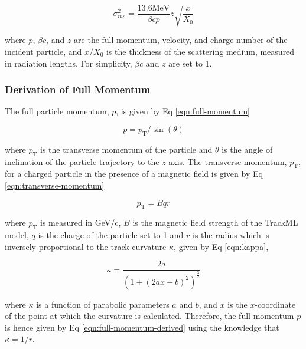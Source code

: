 
\begin{equation}
    \sigma_{ms}^{2} = \frac{13.6 \text{MeV}}{\beta c p} z \sqrt{\frac{x}{X_0}}
    \label{eqn:simplified-moliere-equation}
\end{equation}

where $p$, $\beta c$, and $z$ are the full momentum, velocity, and charge number of the incident particle, and $x/X_0$ is the thickness of the scattering medium, measured in radiation lengths. For simplicity, $\beta c$ and $z$ are set to 1. 




\subsubsection{Derivation of Full Momentum}

The full particle momentum, $p$, is given by Eq \eqref{eqn:full-momentum}

\begin{equation}
    p = p_\text{T} / \sin(\theta)
    \label{eqn:full-momentum}
\end{equation}

where $p_\text{T}$ is the transverse momentum of the particle and $\theta$ is the angle of inclination of the particle trajectory to the $z$-axis. The transverse momentum, $p_\text{T}$, for a charged particle in the presence of a magnetic field is given by Eq \eqref{eqn:transverse-momentum}

\begin{equation}
    p_\text{T} = B q r
    \label{eqn:transverse-momentum}
\end{equation}

where $p_\text{T}$ is measured in GeV/c, $B$ is the magnetic field strength of the TrackML model, $q$ is the charge of the particle set to 1 and $r$ is the radius which is inversely proportional to the track curvature $\kappa$, given by Eq \eqref{eqn:kappa}, 

\begin{equation}
\kappa = \frac{2a}{(1 + (2ax + b)^2)^{\frac{3}{2}}}
\label{eqn:kappa}
\end{equation}

where $\kappa$ is a function of parabolic parameters $a$ and $b$, and $x$ is the $x$-coordinate of the point at which the curvature is calculated. Therefore, the full momentum $p$ is hence given by Eq \eqref{eqn:full-momentum-derived} using the knowledge that $\kappa = 1/r$.

